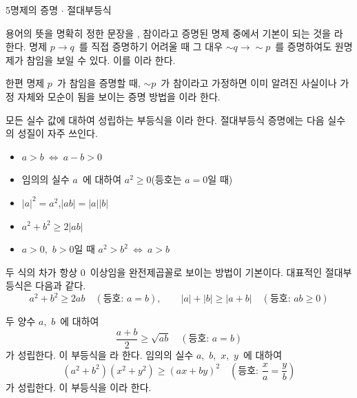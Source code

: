 \documentclass[10pt]{article}
\begin{document}
\newpage

\dmconcepthead
{}

\begin{dmconcept}{5}{명제의 증명 $\cdot$ 절대부등식}
\setlength{\parskip}{1.7mm plus 1.8mm minus 0mm}\linespread{1.26}\selectfont%


용어의 뜻을 명확히 정한 문장을 , 참이라고 증명된 명제 중에서 기본이 되는 것을 라 한다. 명제 $p \to q$\ 를 직접 증명하기 어려울 때 그 대우 $\sim q \to \sim p$\ 를 증명하여도 원명제가 참임을 보일 수 있다. 이를 이라 한다.

한편 명제 $p$\ 가 참임을 증명할 때, $\sim p$\ 가 참이라고 가정하면 이미 알려진 사실이나 가정 자체와 모순이 됨을 보이는 증명 방법을 이라 한다.


모든 실수 값에 대하여 성립하는 부등식을 이라 한다. 절대부등식 증명에는 다음 실수의 성질이 자주 쓰인다.
\begin{itemize}[leftmargin=8mm, itemsep=0.3mm, topsep=0.6mm]
  \item $a > b\ \Longleftrightarrow\ a - b > 0$
  \item 임의의 실수 $a$\ 에 대하여 $a^{2} \ge 0$\quad(등호는 $a = 0$일 때)
  \item $|a|^{2} = a^{2}$,\quad $|ab| = |a||b|$
  \item $a^{2} + b^{2} \ge 2|ab|$
  \item $a > 0$,\ $b > 0$일 때 $a^{2} > b^{2}\ \Longleftrightarrow\ a > b$
\end{itemize}


두 식의 차가 항상 $0$\ 이상임을 완전제곱꼴로 보이는 방법이 기본이다. 대표적인 절대부등식은 다음과 같다.
\begin{equation*}
  a^{2} + b^{2} \ge 2ab \quad (\text{등호: } a = b), \qquad |a| + |b| \ge |a + b| \quad (\text{등호: } ab \ge 0)
\end{equation*}


두 양수 $a$,\ $b$\ 에 대하여
\begin{equation*}
  \frac{a + b}{2} \ge \sqrt{a b} \quad (\text{등호: } a = b)
\end{equation*}
가 성립한다. 이 부등식을 라 한다. 임의의 실수 $a$,\ $b$,\ $x$,\ $y$\ 에 대하여
\begin{equation*}
  (a^{2} + b^{2})(x^{2} + y^{2}) \ge (ax + by)^{2} \quad \left(\text{등호: } \frac{x}{a} = \frac{y}{b}\right)
\end{equation*}
가 성립한다. 이 부등식을 이라 한다.

\end{dmconcept}
\end{document}
